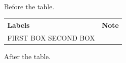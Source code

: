 \documentclass[11pt,a4paper]{article}
\begin{document}
Before the table.

\begin{table}[h]
\begin{tabular}{|l|l|}
\hline
Labels & Note \\ \hline
FIRST BOX  SECOND BOX  \begin{figure}[h] %
\end{tabular}
\end{table}

After the table.
\end{document}
